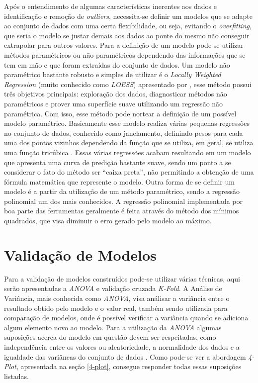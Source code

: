 Após o entendimento de algumas características inerentes aos dados e
identificação e remoção de \textit{outliers}, necessita-se definir um modelos
que se adapte ao conjunto de dados com uma certa flexibilidade, ou seja,
evitando o \textit{overfitting}, que seria o modelo se justar demais aos dados
ao ponte do mesmo não conseguir extrapolar para outros valores. Para a definição
de um modelo pode-se utilizar métodos paramétricos ou não paramétricos
dependendo das informações que se tem em mão e que foram extraídas do conjunto
de dados. Um modelo não paramétrico bastante robusto e simples de utilizar é o
\textit{Locally Weighted Regression} (muito conhecido como \textit{LOESS})
apresentado por , esse método possui três objetivos
principais: exploração dos dados, diagnosticar métodos não paramétricos e prover
uma superfície suave utilizando um regressão não paramétrica. Com isso, esse
método pode nortear a definição de um possível modelo paramétrico. Basicamente
esse modelo realiza várias pequenas regressões no conjunto de dados, conhecido
como janelamento, definindo pesos para cada uma dos pontos vizinhos dependendo da
função que se utiliza, em geral, se utiliza uma função tricúbica
\cite{cleveland:1988}. Essas várias regressões acabam resultando em um modelo
que apresenta uma curva de predição bastante suave, sendo um ponto a se
considerar o fato do método ser ``caixa preta'', não permitindo a obtenção de
uma fórmula matemática que represente o modelo. Outra forma de se definir um
modelo é a partir da utilização de um método paramétrico, sendo a regressão
polinomial um dos mais conhecidos. A regressão polinomial implementada por boa
parte das ferramentas geralmente é feita através do método dos mínimos
quadrados, que visa diminuir o erro gerado pelo modelo ao máximo.

\section{Validação de Modelos}

Para a validação de modelos construídos pode-se utilizar várias técnicas, aqui
serão apresentadas a \textit{ANOVA} e validação cruzada \textit{K-Fold}. A
Análise de Variância, mais conhecida como \textit{ANOVA}, visa análisar a
variância entre o resultado obtido pelo modelo e o valor real, também sendo
utilizada para comparação de modelos, onde é possível verificar a variância
quando se adiciona algum elemento novo ao modelo. Para a utilização da
\textit{ANOVA} algumas suposições acerca do modelo em questão devem ser
respeitadas, como independência entre os valores ou aleatoriedade, a normalidade
dos dados e a igualdade das variâncas do conjunto de dados \cite{snedecor:1967}.
Como pode-se ver a abordagem \textit{4-Plot}, apresentada na seção \ref{4-plot},
consegue responder todas essas suposições listadas. 

